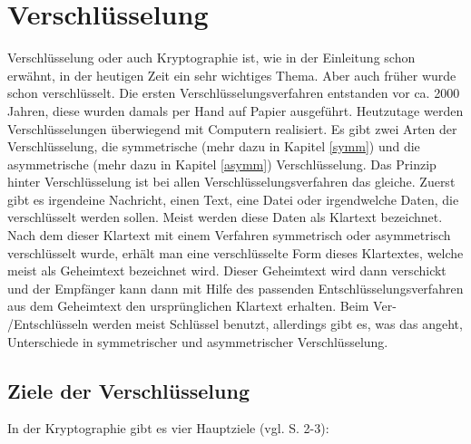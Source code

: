 \documentclass[a4paper,12pt,titlepage]{article}
\begin{document}
\section{Verschlüsselung} \label{crypt}
Verschlüsselung oder auch Kryptographie ist, wie in der Einleitung schon erwähnt, in der heutigen Zeit ein sehr wichtiges Thema. Aber auch früher wurde schon verschlüsselt. Die ersten Verschlüsselungsverfahren entstanden vor ca. 2000 Jahren, diese wurden damals per Hand auf Papier ausgeführt. Heutzutage werden Verschlüsselungen überwiegend mit Computern realisiert. \newline Es gibt zwei Arten der Verschlüsselung, die symmetrische (mehr dazu in Kapitel \ref{symm}) und die asymmetrische (mehr dazu in Kapitel \ref{asymm}) Verschlüsselung. Das Prinzip hinter Verschlüsselung ist bei allen Verschlüsselungsverfahren das gleiche. Zuerst gibt es irgendeine Nachricht, einen Text, eine Datei oder irgendwelche Daten, die verschlüsselt werden sollen. Meist werden diese Daten als Klartext bezeichnet. Nach dem dieser Klartext mit einem Verfahren symmetrisch oder asymmetrisch verschlüsselt wurde, erhält man eine verschlüsselte Form dieses Klartextes, welche meist als Geheimtext bezeichnet wird. Dieser Geheimtext wird dann verschickt und der Empfänger kann dann mit Hilfe des passenden Entschlüsselungsverfahren aus dem Geheimtext den ursprünglichen Klartext erhalten. Beim Ver- /Entschlüsseln werden meist Schlüssel benutzt, allerdings gibt es, was das angeht, Unterschiede in symmetrischer und asymmetrischer Verschlüsselung.

\subsection{Ziele der Verschlüsselung}\label{crypt:goals}
In der Kryptographie gibt es vier Hauptziele (vgl. \cite{delfs_knebl} S. 2-3):
\end{document}
